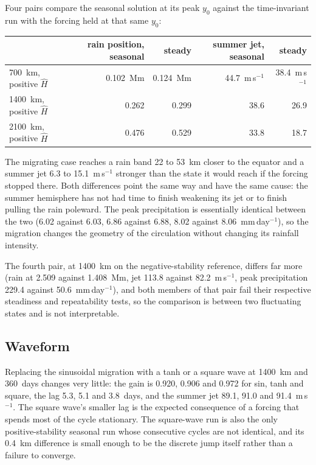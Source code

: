 \documentclass[11pt]{article}
\newcommand{\Hhat}{\hat{H}}
\newcommand{\mmday}{mm\,day$^{-1}$}
\newcommand{\ms}{m\,s$^{-1}$}
\begin{document}
Four pairs compare the seasonal solution at its peak $y_0$ against the
time-invariant run with the forcing held at that same $y_0$:

\begin{center}
\begin{tabular}{lrrrr}
\toprule
 & rain position, seasonal & steady & summer jet, seasonal & steady\\
\midrule
700~km, positive $\Hhat$  & 0.102~Mm & 0.124~Mm & 44.7~\ms & 38.4~\ms\\
1400~km, positive $\Hhat$ & 0.262    & 0.299    & 38.6     & 26.9\\
2100~km, positive $\Hhat$ & 0.476    & 0.529    & 33.8     & 18.7\\
\bottomrule
\end{tabular}
\end{center}

The migrating case reaches a rain band 22 to 53~km closer to the equator and a
summer jet 6.3 to 15.1~\ms{} stronger than the state it would reach if the
forcing stopped there. Both differences point the same way and have the same
cause: the summer hemisphere has not had time to finish weakening its jet or to
finish pulling the rain poleward. The peak precipitation is essentially identical
between the two (6.02 against 6.03, 6.86 against 6.88, 8.02 against
8.06~\mmday), so the migration changes the geometry of the circulation without
changing its rainfall intensity.

The fourth pair, at 1400~km on the negative-stability reference, differs far more
(rain at 2.509 against 1.408~Mm, jet 113.8 against 82.2~\ms, peak precipitation
229.4 against 50.6~\mmday), and both members of that pair fail their respective
steadiness and repeatability tests, so the comparison is between two fluctuating
states and is not interpretable.

\subsection{Waveform}

Replacing the sinusoidal migration with a tanh or a square wave at 1400~km and
360~days changes very little: the gain is 0.920, 0.906 and 0.972 for sin, tanh
and square, the lag 5.3, 5.1 and 3.8~days, and the summer jet 89.1, 91.0 and
91.4~\ms. The square wave's smaller lag is the expected consequence of a forcing
that spends most of the cycle stationary. The square-wave run is also the only
positive-stability seasonal run whose consecutive cycles are not identical, and
its 0.4~km difference is small enough to be the discrete jump itself rather than
a failure to converge.
\end{document}
